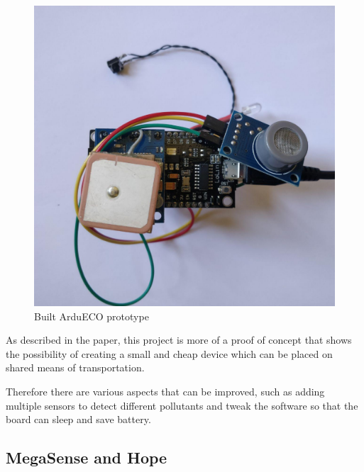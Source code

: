 			\noindent
			\begin{minipage}{0.38\textwidth}
				\begin{figure}[H]
					\centering
					\includegraphics[width=\textwidth]{resources/img/chap2/ardueco_picture}
					\caption{Built ArduECO prototype}
					\label{img:ardueco_picture}
				\end{figure}
			\end{minipage}%
			\hfill%
			\begin{minipage}{0.6\textwidth}\raggedright
				As described in the paper, this project is more of a proof of concept that shows the possibility of creating a small and cheap device which can be placed on shared means of transportation.
				
				Therefore there are various aspects that can be improved, such as adding multiple sensors to detect different pollutants and tweak the software so that the board can sleep and save battery.
			\end{minipage}

		\subsection{MegaSense and Hope}\label{subsec:megasense}
	
	
